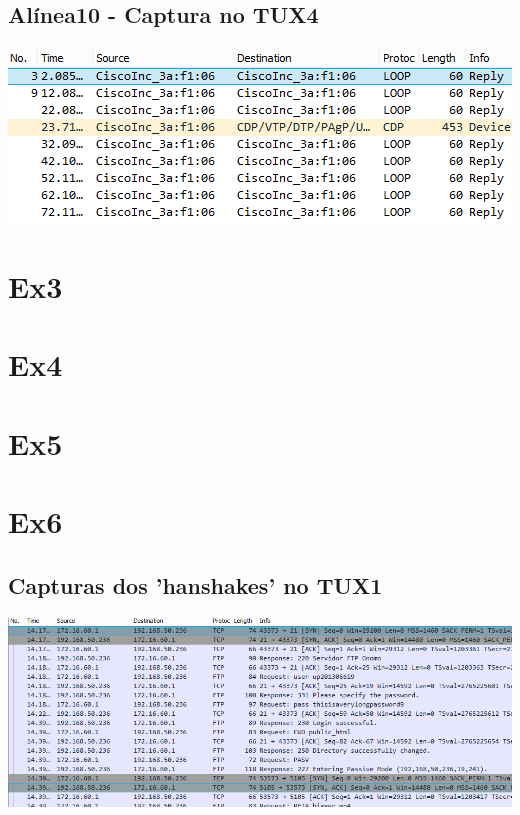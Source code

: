 \documentclass[11pt,a4paper,reqno]{report}
\numberwithin{equation}{section}
\begin{document}
\begin{appendices}
\subsection{Alínea10 - Captura no TUX4}
\includegraphics[width=18cm]{ex2_a10_tux4.png}

\section{Ex3}

\section{Ex4}

\section{Ex5}

\section{Ex6}

\subsection{Capturas dos 'hanshakes' no TUX1}
\label{ex6_tux1_handshakes}
\includegraphics[width=18cm]{ex6_tux1_handshakes.png}


\end{appendices}
\end{document}
